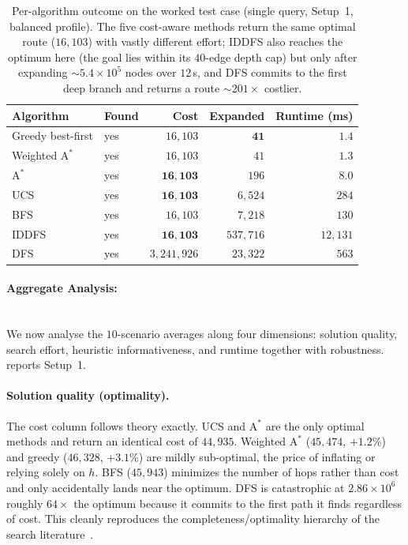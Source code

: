 \documentclass{ai-lab-report}
\begin{document}
\begin{table}[H]
\centering
\small
\begin{tabularx}{\linewidth}{@{}lXrrr@{}}
\toprule
Algorithm & Found & Cost & Expanded & Runtime (ms) \\
\midrule
Greedy best-first & yes & $16{,}103$ & $\mathbf{41}$   & $1.4$ \\
Weighted $\text{A}^\ast$ & yes & $16{,}103$ & $41$   & $1.3$ \\
$\text{A}^\ast$   & yes & $\mathbf{16{,}103}$ & $196$  & $8.0$ \\
UCS               & yes & $\mathbf{16{,}103}$ & $6{,}524$ & $284$ \\
BFS               & yes & $16{,}103$ & $7{,}218$ & $130$ \\
IDDFS             & yes & $\mathbf{16{,}103}$ & $537{,}716$ & $12{,}131$ \\
DFS               & yes & $3{,}241{,}926$ & $23{,}322$ & $563$ \\
\bottomrule
\end{tabularx}
\caption{Per-algorithm outcome on the worked test case (single query, Setup~1, balanced profile). The five cost-aware methods return the same optimal route ($16{,}103$) with vastly different effort; IDDFS also reaches the optimum here (the goal lies within its $40$-edge depth cap) but only after expanding ${\sim}5.4\times10^{5}$ nodes over $12$\,s, and DFS commits to the first deep branch and returns a route ${\sim}201\times$ costlier.}
\label{tab:a1testcase}
\end{table}


\paragraph{Aggregate Analysis:} 
\mbox{}\\
We now analyse the $10$-scenario averages along four dimensions: solution quality, search effort, heuristic informativeness, and runtime together with robustness.  reports Setup~1.

\paragraph{Solution quality (optimality).}
The cost column follows theory exactly. UCS and $\text{A}^\ast$ are the only optimal methods and return an identical cost of $44{,}935$. Weighted $\text{A}^\ast$ ($45{,}474$, $+1.2\%$) and greedy ($46{,}328$, $+3.1\%$) are mildly sub-optimal, the price of inflating or relying solely on $h$. BFS ($45{,}943$) minimizes the number of hops rather than cost and only accidentally lands near the optimum. DFS is catastrophic at $2.86\times10^{6}$ roughly $64\times$ the optimum because it commits to the first path it finds regardless of cost. This cleanly reproduces the completeness/optimality hierarchy of the search literature~\citep{russell2021ai}.
\end{document}
